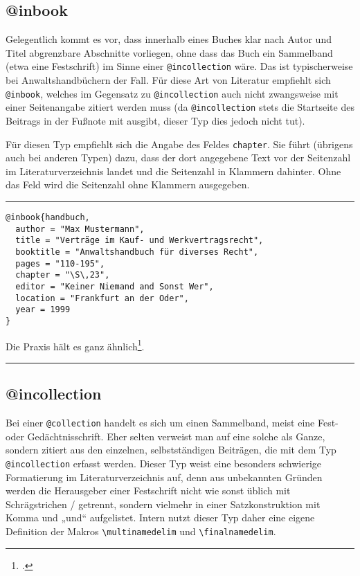 \documentclass[11pt,a4paper,DIV=calc,draft]{scrartcl}
\newenvironment{rubexample}{\par\vspace{\baselineskip}\hrule\par\begin{refsection}}{\end{refsection}\par\hrule\par\vspace{\baselineskip}}
\begin{document}
\subsection{@inbook}

Gelegentlich kommt es vor, dass innerhalb eines Buches klar nach Autor
und Titel abgrenzbare Abschnitte vorliegen, ohne dass das Buch ein
Sammelband (etwa eine Festschrift) im Sinne einer \verb+@incollection+
wäre. Das ist typischerweise bei Anwaltshandbüchern der Fall. Für diese
Art von Literatur empfiehlt sich \verb+@inbook+, welches im Gegensatz
zu \verb+@incollection+ auch nicht zwangsweise mit einer Seitenangabe
zitiert werden muss (da \verb+@incollection+ stets die Startseite des
Beitrags in der Fußnote mit ausgibt, dieser Typ dies jedoch nicht
tut).


Für diesen Typ empfiehlt sich die Angabe des Feldes
\verb+chapter+. Sie führt (übrigens auch bei anderen Typen) dazu, dass
der dort angegebene Text vor der Seitenzahl im Literaturverzeichnis
landet und die Seitenzahl in Klammern dahinter. Ohne das Feld wird die
Seitenzahl ohne Klammern ausgegeben.

\begin{rubexample}
\begin{verbatim}
@inbook{handbuch,
  author = "Max Mustermann",
  title = "Verträge im Kauf- und Werkvertragsrecht",
  booktitle = "Anwaltshandbuch für diverses Recht",
  pages = "110-195",
  chapter = "\S\,23",
  editor = "Keiner Niemand and Sonst Wer",
  location = "Frankfurt an der Oder",
  year = 1999
}
\end{verbatim}

Die Praxis hält es ganz ähnlich\footcite[\S\,23 Rnr.\,55]{handbuch}.

\printbibliography
\end{rubexample}

\subsection{@incollection}\label{sec:incollection}

Bei einer \verb+@collection+ handelt es sich um einen Sammelband,
meist eine Fest- oder Gedächtnisschrift. Eher selten verweist man auf
eine solche als Ganze, sondern zitiert aus den einzelnen,
selbstständigen Beiträgen, die mit dem Typ \verb+@incollection+
erfasst werden. Dieser Typ weist eine besonders schwierige
Formatierung im Literaturverzeichnis auf, denn aus unbekannten Gründen
werden die Herausgeber einer Festschrift nicht wie sonst üblich mit
Schrägstrichen / getrennt, sondern vielmehr in einer Satzkonstruktion
mit Komma und „und“ aufgelistet. Intern nutzt dieser Typ daher eine
eigene Definition der Makros \verb+\multinamedelim+ und
\verb+\finalnamedelim+.
\end{document}
